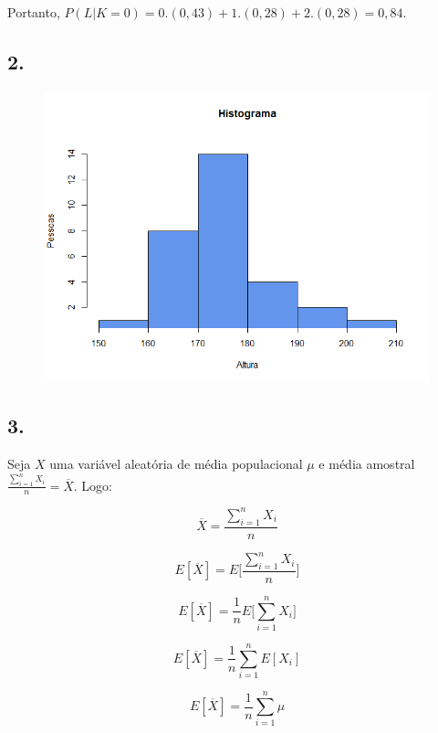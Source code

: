 \documentclass[hidelinks,11pt]{book}
\theoremstyle{definition}
\begin{document}
Portanto, $P(L|K = 0) = 0.(0,43) + 1.(0,28) + 2.(0,28) = 0,84$.

	\subsection*{2.}
\begin{figure}[H]
	\centering
	\includegraphics[width=0.7\linewidth]{Histograma}
	\caption*{}
\end{figure}





	\subsection*{3.}


Seja $X$ uma variável aleatória de média populacional  $\mu$ e média amostral $\frac{\sum_{i = 1}^{n} X_i}{n}=\overline{X}$. Logo:

\begin{displaymath}
	\overline{X} = \frac{\sum_{i = 1}^{n} X_i}{n}
\end{displaymath}

\begin{displaymath}
	E[\overline{X}] = E\Bigg[\frac{\sum_{i = 1}^{n} X_i}{n}\Bigg]
\end{displaymath}

\begin{displaymath}
	E[\overline{X}] = \frac{1}{n}E\Bigg[\sum_{i = 1}^{n} X_i\Bigg]
\end{displaymath}

\begin{displaymath}
	E[\overline{X}] = \frac{1}{n}\sum_{i = 1}^{n} E[X_i]
\end{displaymath}

\begin{displaymath}
	E[\overline{X}] = \frac{1}{n}\sum_{i = 1}^{n} \mu
\end{displaymath}
\end{document}
